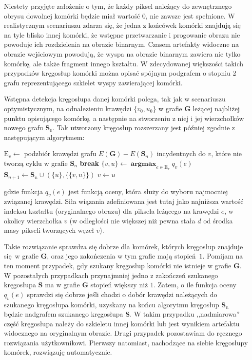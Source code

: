 \documentclass[declaration,shortabstract,mgr]{iithesis}
\DeclareMathOperator*{\argmax}{\textbf{argmax}}
\begin{document}
Niestety przyjęte założenie o tym, że każdy piksel należący do zewnętrznego obrysu dowolnej komórki będzie miał wartość $0$, nie zawsze jest spełnione. W realistycznym scenariuszu zdarza się, że jedna z końcówek komórki znajdują się na tyle blisko innej komórki, że wstępne przetwarzanie i progowanie obrazu nie powoduje ich rozdzielenia na obrazie binarnym. Czasem artefakty widoczne na obrazie wejściowym powodują, że wyspa na obrazie binarnym zawiera nie tylko komórkę, ale także fragment innego kształtu. W zdecydowanej większości takich przypadków kręgosłup komórki można opisać spójnym podgrafem o stopniu 2 grafu reprezentującego szkielet wyspy zawierającej komórki.

Wstępna detekcja kręgosłupa danej komórki polega, tak jak w scenariuszu optymistycznym, na odnalezieniu krawędzi $\{v_0, u_0\}$ w grafie $\mathbf{G}$ leżącej najbliżej punktu opisującego komórkę, a następnie na stworzeniu z niej i jej wierzchołków nowego grafu $\mathbf{S}_0$. Tak utworzony kręgosłup rozszerzany jest później zgodnie z następującym algorytmem:

\begin{algorithmic}
  \LOOP
    \STATE
      $\text{E}_v \gets$ podzbiór krawędzi grafu $E(\mathbf{G}) - E(\mathbf{S}_n)$ incydentnych do $v$,\newline
       które nie tworzą cyklu w grafie $\mathbf{S}_n$
      \STATE \textbf{break}
    \ENDIF
    \STATE $\{v, u\} \gets \argmax_{e \in \text{E}_v} q_v(e)$
    \STATE $\mathbf{S}_{n+1} \gets \mathbf{S}_n \cup (\{u\}, \{\{v, u\}\}) $
    \STATE $v \gets u$
  \ENDLOOP
\ENDFOR
\end{algorithmic}
gdzie funkcja $q_v(e)$ jest funkcją oceny, która służy do wyboru najmocniej związanej krawędzi. Siła wiązania zdefiniowana jest tutaj jako najniższa wartość indeksu kształtu (oryginalnego obrazu) dla piksela leżącego na krawędzi $e$, w okolicy wierzchołka $v$ (w odległości nie większej niż pewna stała $d$ od środka masy pikseli tworzących węzeł $v$).

Takie rozwiązanie sprawdza się dobrze dla komórek, których kręgosłup znajduje się w grafie $\mathbf{G}$, oraz jego zakończenia w tym grafie mają stopień $1$. Pomijam na ten moment przypadek, gdy szukany kręgosłup komórki nie istnieje w grafie $\mathbf{G}$. W pozostałych przypadkach przynajmniej jedno z zakończeń szukanego kręgosłupa $\mathbf{S}$ ma w grafie $\mathbf{G}$ stopień większy niż $1$. Zatem, o ile funkcja oceny $q_v(e)$ sprawdzi się dobrze jeśli chodzi o dobór krawędzi należących do szukanego kręgosłupa komórki, uzyskany na końcu algorytmu kręgosłup $\mathbf{S}_n$ będzie nadgrafem szukanego kręgosłupa $\mathbf{S}$. W takim przypadku ,,nadmiarowa'' część kręgosłupa należy do szkieletu innej komórki lub jest wynikiem artefaktu widocznego na oryginalnym obrazie. Drugi przypadek pozostawiam do ręcznego rozwiązania użytkownikowi. Pierwszy natomiast, nachodzące na siebie kręgosłupy komórek, rozwiązuję automatycznie.
\end{document}
